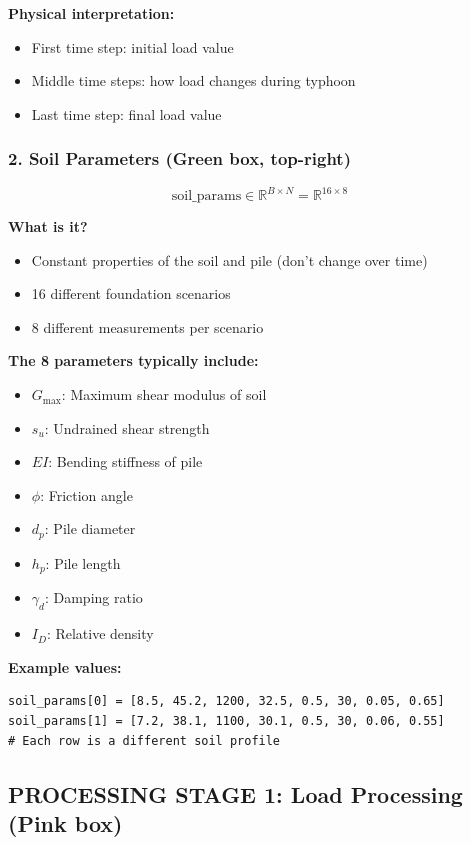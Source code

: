 \documentclass[11pt,a4paper]{article}
\begin{document}
\textbf{Physical interpretation:}
\begin{itemize}
  \item First time step: initial load value
  \item Middle time steps: how load changes during typhoon
  \item Last time step: final load value
\end{itemize}

\subsubsection{2. Soil Parameters (Green box, top-right)}

\begin{equation}
\text{soil\_params} \in \mathbb{R}^{B \times N} = \mathbb{R}^{16 \times 8}
\end{equation}

\textbf{What is it?}
\begin{itemize}
  \item Constant properties of the soil and pile (don't change over time)
  \item 16 different foundation scenarios
  \item 8 different measurements per scenario
\end{itemize}

\textbf{The 8 parameters typically include:}
\begin{itemize}
  \item $G_{\max}$: Maximum shear modulus of soil
  \item $s_u$: Undrained shear strength
  \item $EI$: Bending stiffness of pile
  \item $\phi$: Friction angle
  \item $d_p$: Pile diameter
  \item $h_p$: Pile length
  \item $\gamma_d$: Damping ratio
  \item $I_D$: Relative density
\end{itemize}

\textbf{Example values:}
\begin{lstlisting}
soil_params[0] = [8.5, 45.2, 1200, 32.5, 0.5, 30, 0.05, 0.65]
soil_params[1] = [7.2, 38.1, 1100, 30.1, 0.5, 30, 0.06, 0.55]
# Each row is a different soil profile
\end{lstlisting}

\subsection{PROCESSING STAGE 1: Load Processing (Pink box)}
\end{document}
